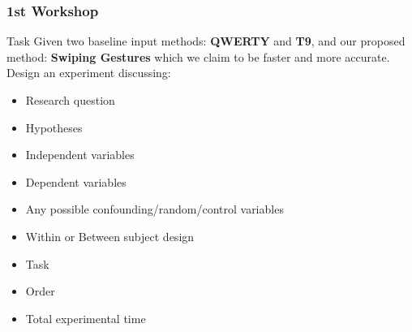 \documentclass{beamer}
\begin{document}
\begin{frame}
	\frametitle{1st Workshop}
	\footnotesize
	\begin{block}{Task}	
	Given two baseline input methods: \textbf{QWERTY} and \textbf{T9}, and our proposed method: \textbf{Swiping Gestures} which we claim to be faster and more accurate.   Design an experiment discussing:
	\begin{itemize}
	\item Research question
	\item Hypotheses
	\item Independent variables
	\item Dependent variables
	\item Any possible confounding/random/control variables
	\item Within or Between subject design
	\item Task
	\item Order
	\item Total experimental time
	\end{itemize}
	\end{block}
\end{frame}
%
\end{document}
